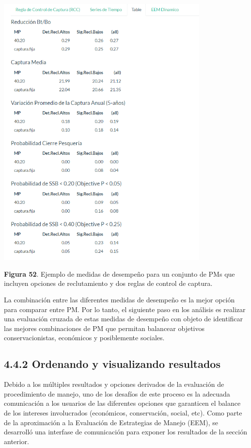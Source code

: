 \documentclass[
  spanish,
]{article}
\begin{document}
\begin{center}
\includegraphics[width=0.8\textwidth]{Figuras/Figura_52.png}
\end{center}

\small \textbf{Figura 52}. Ejemplo de medidas de desempeño para un
conjunto de PMs que incluyen opciones de reclutamiento y dos reglas de
control de captura. \vspace{0.5cm} \normalsize

La combinación entre las diferentes medidas de desempeño es la mejor
opción para comparar entre PM. Por lo tanto, el siguiente paso en los
análisis es realizar una evaluación cruzada de estas medidas de
desempeño con objeto de identificar las mejores combinaciones de PM que
permitan balancear objetivos conservacionistas, económicos y
posiblemente sociales.

\hypertarget{ordenando-y-visualizando-resultados}{%
\subsection{4.4.2 Ordenando y visualizando
resultados}\label{ordenando-y-visualizando-resultados}}

Debido a los múltiples resultados y opciones derivados de la evaluación
de procedimiento de manejo, uno de los desafíos de este proceso es la
adecuada comunicación a los usuarios de las diferentes opciones que
garanticen el balance de los intereses involucrados (económicos,
conservación, social, etc). Como parte de la aproximación a la
Evaluación de Estrategias de Manejo (EEM), se desarrolló una interfase
de comunicación para exponer los resultados de la sección anterior.
\end{document}
